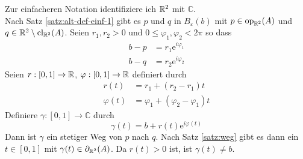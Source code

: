     \begin{bew}
        Zur einfacheren Notation identifiziere ich $\mathbb{R}^2$ mit $\mathbb{C}$.\\
        Nach Satz \ref{satz:alt-def-einf-1} gibt es $p$ und $q$ in $B_\varepsilon(b)$ mit $p \in \text{op}_{\mathbb{R}^2}(A)$ und $q \in \mathbb{R}^2 \setminus \text{cl}_{\mathbb{R}^2}(A)$. Seien $r_1, r_2 > 0$ und $0 \leq \varphi_1, \varphi_2 < 2\pi$ so dass 
        \begin{align*}
            b-p &= r_1 \text{e}^{i \varphi_1}\\
            b-q &= r_2 \text{e}^{i \varphi_2}
        \end{align*}
        Seien $r: [0,1] \to \mathbb{R}$, $\varphi: [0,1] \to \mathbb{R}$ definiert durch
        \begin{align*}
            r(t) &= r_1 + (r_2 - r_1)t\\
            \varphi(t) &= \varphi_1 + (\varphi_2 - \varphi_1)t
        \end{align*}
        Definiere $\gamma: [0,1] \to \mathbb{C}$ durch
        \[\gamma(t) = b + r(t) \text{e}^{i \varphi(t)}\]
        Dann ist $\gamma$ ein stetiger Weg von $p$ nach $q$. Nach Satz \ref{satz:weg} gibt es dann ein $t \in [0,1]$ mit $\gamma(t) \in \partial_{\mathbb{R}^2}(A)$. Da $r(t) > 0$ ist, ist $\gamma(t) \neq b$.
    \end{bew}
%     
    
